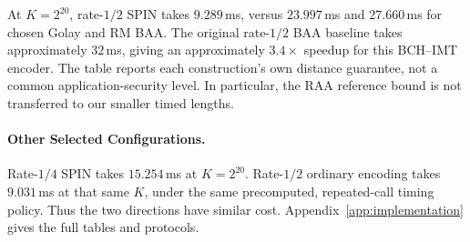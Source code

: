 At $K=2^{20}$, rate-$1/2$ SPIN takes $9.289$\,ms, versus $23.997$\,ms
and $27.660$\,ms for chosen Golay and RM BAA.
The original rate-$1/2$ BAA baseline takes approximately $32$\,ms,
giving an approximately $3.4\times$ speedup for this BCH--IMT encoder.
The table reports each construction's own distance guarantee, not a
common application-security level. In particular, the RAA reference
bound is not transferred to our smaller timed lengths.

\paragraph{Other Selected Configurations.}
Rate-$1/4$ SPIN takes $15.254$\,ms at $K=2^{20}$.
Rate-$1/2$ ordinary encoding takes $9.031$\,ms at that same $K$, under
the same precomputed, repeated-call timing policy. Thus the two directions
have similar cost.
Appendix~\ref{app:implementation} gives the full tables and protocols.
